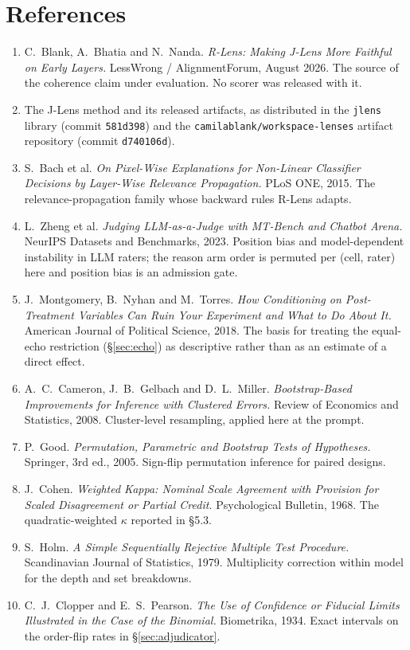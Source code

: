 \documentclass[11pt]{article}
\begin{document}
\section*{References}
\small
\begin{enumerate}[leftmargin=1.4em,itemsep=1pt]
\item C.~Blank, A.~Bhatia and N.~Nanda. \emph{R-Lens: Making J-Lens More Faithful
      on Early Layers.} LessWrong / AlignmentForum, August 2026. The source of
      the coherence claim under evaluation. No scorer was released with it.
\item The J-Lens method and its released artifacts, as distributed in the
      \texttt{jlens} library (commit \texttt{581d398}) and the
      \texttt{camilablank/\allowbreak{}workspace-lenses} artifact repository
      (commit \texttt{d740106d}).
\item S.~Bach et al. \emph{On Pixel-Wise Explanations for Non-Linear Classifier
      Decisions by Layer-Wise Relevance Propagation.} PLoS ONE, 2015. The
      relevance-propagation family whose backward rules R-Lens adapts.
\item L.~Zheng et al. \emph{Judging LLM-as-a-Judge with MT-Bench and Chatbot
      Arena.} NeurIPS Datasets and Benchmarks, 2023. Position bias and
      model-dependent instability in LLM raters; the reason arm order is
      permuted per (cell, rater) here and position bias is an admission gate.
\item J.~Montgomery, B.~Nyhan and M.~Torres. \emph{How Conditioning on
      Post-Treatment Variables Can Ruin Your Experiment and What to Do About It.}
      American Journal of Political Science, 2018. The basis for treating the
      equal-echo restriction (\S\ref{sec:echo}) as descriptive rather than as an
      estimate of a direct effect.
\item A.~C.~Cameron, J.~B.~Gelbach and D.~L.~Miller. \emph{Bootstrap-Based
      Improvements for Inference with Clustered Errors.} Review of Economics and
      Statistics, 2008. Cluster-level resampling, applied here at the prompt.
\item P.~Good. \emph{Permutation, Parametric and Bootstrap Tests of Hypotheses.}
      Springer, 3rd ed., 2005. Sign-flip permutation inference for paired designs.
\item J.~Cohen. \emph{Weighted Kappa: Nominal Scale Agreement with Provision for
      Scaled Disagreement or Partial Credit.} Psychological Bulletin, 1968. The
      quadratic-weighted $\kappa$ reported in \S5.3.
\item S.~Holm. \emph{A Simple Sequentially Rejective Multiple Test Procedure.}
      Scandinavian Journal of Statistics, 1979. Multiplicity correction within
      model for the depth and set breakdowns.
\item C.~J.~Clopper and E.~S.~Pearson. \emph{The Use of Confidence or Fiducial
      Limits Illustrated in the Case of the Binomial.} Biometrika, 1934. Exact
      intervals on the order-flip rates in \S\ref{sec:adjudicator}.
\end{enumerate}
\end{document}
